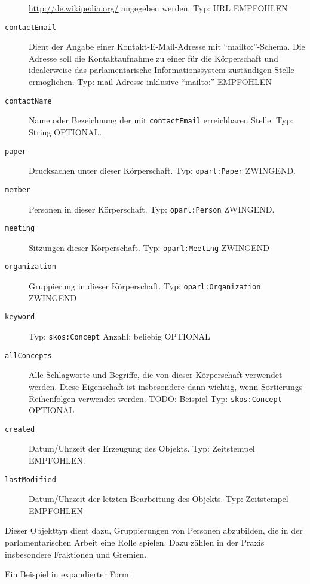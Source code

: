 \documentclass[,a4paper]{article}
\begin{document}
\begin{description}
{  \url{http://de.wikipedia.org/}} angegeben werden. Typ: URL EMPFOHLEN
\item[\texttt{contactEmail}]
Dient der Angabe einer Kontakt-E-Mail-Adresse mit ``mailto:''-Schema.
Die Adresse soll die Kontaktaufnahme zu einer für die Körperschaft und
idealerweise das parlamentarische Informationssystem zuständigen Stelle
ermöglichen. Typ: mail-Adresse inklusive ``mailto:'' EMPFOHLEN
\item[\texttt{contactName}]
Name oder Bezeichnung der mit \texttt{contactEmail} erreichbaren Stelle.
Typ: String OPTIONAL.
\item[\texttt{paper}]
Drucksachen unter dieser Körperschaft. Typ: \texttt{oparl:Paper}
ZWINGEND.
\item[\texttt{member}]
Personen in dieser Körperschaft. Typ: \texttt{oparl:Person} ZWINGEND.
\item[\texttt{meeting}]
Sitzungen dieser Körperschaft. Typ: \texttt{oparl:Meeting} ZWINGEND
\item[\texttt{organization}]
Gruppierung in dieser Körperschaft. Typ: \texttt{oparl:Organization}
ZWINGEND
\item[\texttt{keyword}]
Typ: \texttt{skos:Concept} Anzahl: beliebig OPTIONAL
\item[\texttt{allConcepts}]
Alle Schlagworte und Begriffe, die von dieser Körperschaft verwendet
werden. Diese Eigenschaft ist insbesondere dann wichtig, wenn
Sortierungs-Reihenfolgen verwendet werden. TODO: Beispiel Typ:
\texttt{skos:Concept} OPTIONAL
\item[\texttt{created}]
Datum/Uhrzeit der Erzeugung des Objekts. Typ: Zeitstempel EMPFOHLEN.
\item[\texttt{lastModified}]
Datum/Uhrzeit der letzten Bearbeitung des Objekts. Typ: Zeitstempel
EMPFOHLEN
\end{description}


Dieser Objekttyp dient dazu, Gruppierungen von Personen abzubilden, die
in der parlamentarischen Arbeit eine Rolle spielen. Dazu zählen in der
Praxis insbesondere Fraktionen und Gremien.

Ein Beispiel in expandierter Form:
\end{document}
